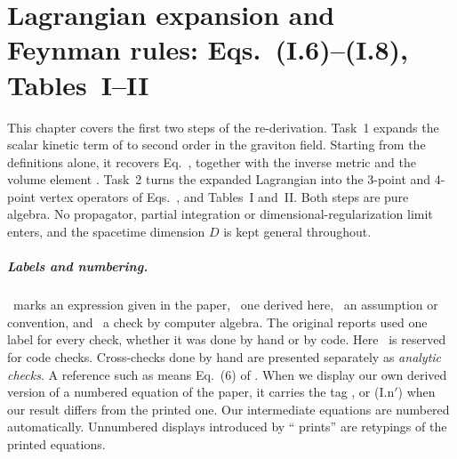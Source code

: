 \providecommand{\chAh}{\mathsf{h}}            %
\providecommand{\chAone}{\mathbf{1}}          %
\providecommand{\chATr}{\operatorname{Tr}}    %
\providecommand{\chAdd}{\partial_1\!\cdot\partial_2}
\providecommand{\chAdp}{\partial\phi\cdot\partial\phi}

\chapter{Lagrangian expansion and Feynman rules: Eqs.~(I.6)--(I.8), Tables~I--II}
\label{ch:feynman-rules}

This chapter covers the first two steps of the re-derivation. Task~1 expands
the scalar kinetic term of \PI{} to second order in the graviton field. Starting
from the definitions alone, it recovers Eq.~, together with the inverse
metric  and the volume element . Task~2 turns the expanded
Lagrangian into the 3-point and 4-point vertex operators of Eqs.~,
 and Tables~I and~II. Both steps are pure algebra. No propagator, partial
integration or dimensional-regularization limit enters, and the spacetime
dimension $D$ is kept general throughout.

\paragraph{Labels and numbering.}
\tP\ marks an expression given in the paper, \tD\ one derived here, \tA\ an
assumption or convention, and \tC\ a check by computer algebra. The original
reports used one label for every check, whether it was done by hand or by code.
Here \tC\ is reserved for code checks. Cross-checks done by hand are presented
separately as \emph{analytic checks}. A reference such as  means Eq.~(6)
of \PI. When we display our own derived version of a numbered equation of the
paper, it carries the tag , or (I.n$'$) when our result differs from the
printed one. Our intermediate equations are numbered automatically. Unnumbered
displays introduced by ``\PI{} prints'' are retypings of the printed equations.

